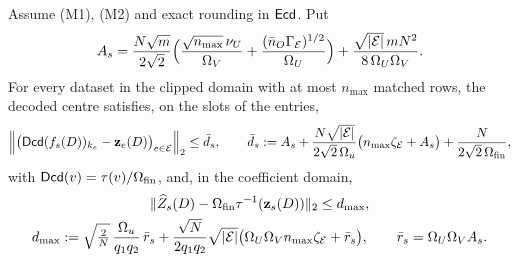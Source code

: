 \begin{proposition}\label{prop:offset}
Assume (M1), (M2) and exact rounding in $\mathsf{Ecd}$. Put
\[
  A_s=\frac{N\sqrt m}{2\sqrt2}\Bigl(\frac{\sqrt{n_{\max}}\,\nu_U}{\Omega_V}+\frac{(\bar n_O\Gamma_{\mathcal E})^{1/2}}{\Omega_U}\Bigr)+\frac{\sqrt{|\mathcal E|}\,mN^2}{8\,\Omega_U\Omega_V}.
\]
For every dataset in the clipped domain with at most $n_{\max}$ matched rows, the decoded centre satisfies, on the slots of the entries,
\[
  \Bigl\|\bigl(\mathsf{Dcd}(f_s(D))_{k_e}-\mathbf z_e(D)\bigr)_{e\in\mathcal E}\Bigr\|_2\le\bar d_s,\qquad
  \bar d_s:=A_s+\frac{N\sqrt{|\mathcal E|}}{2\sqrt2\,\Omega_u}\bigl(n_{\max}\zeta_{\mathcal E}+A_s\bigr)+\frac{N}{2\sqrt2\,\Omega_{\mathrm{fin}}},
\]
with $\mathsf{Dcd}(v)=\tau(v)/\Omega_{\mathrm{fin}}$, and, in the coefficient domain,
\begin{gather*}
  \lVert \widehat Z_s(D)-\Omega_{\mathrm{fin}}\tau^{-1}(\mathbf z_s(D))\rVert_2\le d_{\max},\\
  d_{\max}:=\sqrt{\tfrac2N}\,\frac{\Omega_u}{q_1q_2}\,\bar r_s+\frac{\sqrt N}{2q_1q_2}\sqrt{|\mathcal E|}\bigl(\Omega_U\Omega_Vn_{\max}\zeta_{\mathcal E}+\bar r_s\bigr),\qquad \bar r_s=\Omega_U\Omega_VA_s .
\end{gather*}
\end{proposition}
